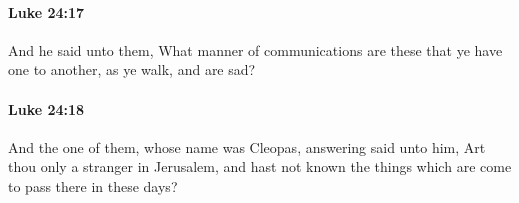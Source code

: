 		\paragraph{Luke 24:17} %
			\label{LUKE-24-17}

			And he said unto them, What manner of communications are these that ye have one to another, as ye walk, and are sad?

			\begin{framed}
			\scriptsize
				\begin{compactdesc}
					\item[SBLG] 
				\end{compactdesc}
			\end{framed}

		\paragraph{Luke 24:18} %
			\label{LUKE-24-18}

			And the one of them, whose name was Cleopas, answering said unto him, Art thou only a stranger in Jerusalem, and hast not known the things which are come to pass there in these days?


